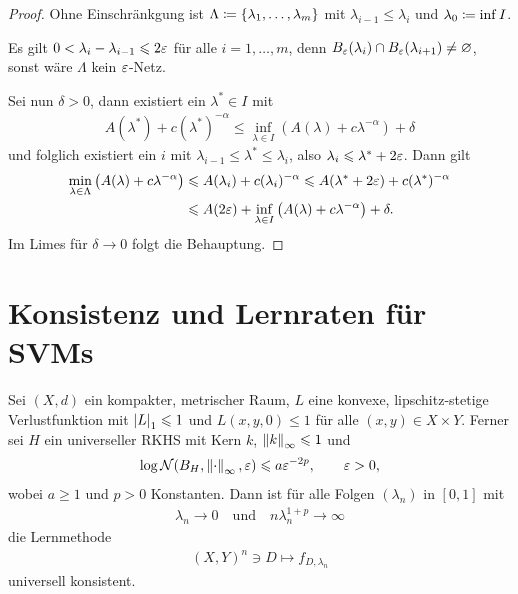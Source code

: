 \begin{proof}
Ohne Einschränkgung ist $\Lambda\coloneq\left\{ \lambda_1,\ldots,\lambda_m \right\}$ mit
$\lambda_{i-1}\le \lambda_i$ und $\lambda_0 \coloneq \inf I$.

Es gilt $0 < \lambda_i-\lambda_{i-1} \leqslant 2 \varepsilon$ für alle $i=1,\ldots,m$,
denn $B_\varepsilon(\lambda_i)\cap B_\varepsilon(\lambda_{i+1})\neq \varnothing$, sonst wäre
$\Lambda$ kein $\varepsilon$-Netz. 

Sei nun $\delta > 0$, dann existiert ein $\lambda^*\in I$ mit
\begin{align*}
A(\lambda^*) + c(\lambda^*)^{-\alpha} \le 
\inf_{\lambda\in I} \left(A(\lambda) + c\lambda^{-\alpha} \right) + \delta
\end{align*}
und folglich existiert ein $i$ mit $\lambda_{i-1}\le \lambda^*\le\lambda_i$,
also $\lambda_i \leqslant \lambda^*+ 2\varepsilon$. Dann gilt
\begin{align*}
\min_{\lambda\in\Lambda} \left(A(\lambda) + c\lambda^{-\alpha}\right)
&\leqslant A(\lambda_i) + c(\lambda_i)^{-\alpha}
\leqslant A(\lambda^*+2\varepsilon) + c(\lambda^*)^{-\alpha}\\
&\leqslant A(2\varepsilon) + \inf_{\lambda\in I} \left(A(\lambda) + c\lambda^{-\alpha} \right)
+ \delta.
\end{align*}
Im Limes für $\delta \to 0$ folgt die Behauptung.\qedhere 
\end{proof}

\section{Konsistenz und Lernraten für SVMs}

\begin{prop}
\label{prop:6.4.1}
Sei $(X,d)$ ein kompakter, metrischer Raum, $L$ eine konvexe, lipschitz-stetige
Verlustfunktion mit $\left|L\right|_1 \leqslant 1$ und $L(x,y,0)\le 1$ für alle $(x,y)\in
X\times Y$. Ferner sei $H$ ein universeller RKHS mit Kern $k$,
$\left\|k\right\|_\infty\leqslant 1$ und
\begin{align*}
\log \mathcal{N}(B_H,\left\|\cdot\right\|_\infty,\varepsilon) \leqslant a \varepsilon^{-2p},\qquad \varepsilon > 0,
\end{align*}
wobei $a\ge 1$ und $p>0$ Konstanten. Dann ist für alle Folgen $(\lambda_n)$ in
$[0,1]$ mit 
\begin{align*}
\lambda_n\to 0\quad  \text{und} \quad
n\lambda_n^{1+p} \to \infty
\end{align*}
die Lernmethode
\begin{align*}
(X,Y)^n \ni D \mapsto f_{D,\lambda_n}
\end{align*}
universell konsistent.\fishhere
\end{prop}

